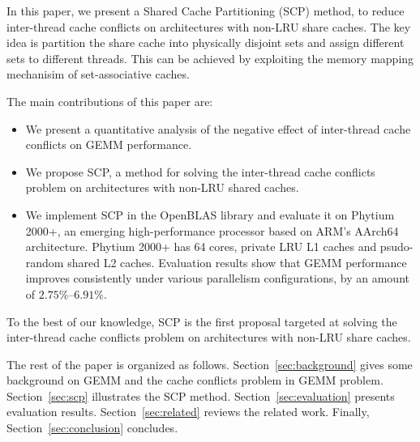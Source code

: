 In this paper, we present a Shared Cache Partitioning (SCP) method,
to reduce inter-thread cache conflicts on architectures with non-LRU share caches.
The key idea is partition the share cache into physically disjoint sets
and assign different sets to different threads. This can be achieved by
exploiting the memory mapping mechanisim of set-associative caches.

The main contributions of this paper are:
\begin{itemize}
\item We present a quantitative analysis of the negative effect of inter-thread cache
  conflicts on GEMM performance.
\item We propose SCP, a method for solving the inter-thread cache conflicts
  problem on architectures with non-LRU shared caches.
\item We implement SCP in the OpenBLAS library and evaluate it on Phytium 2000+,
  an emerging high-performance processor based on ARM's AArch64 architecture.
  Phytium 2000+ has 64 cores, private LRU L1 caches
  and psudo-random shared L2 caches.
  Evaluation results show that GEMM performance improves consistently
  under various parallelism configurations, by an amount of $2.75\%$--$6.91\%$.
\end{itemize}

To the best of our knowledge, SCP is the first proposal targeted at
solving the inter-thread cache conflicts problem on
architectures with non-LRU share caches.

The rest of the paper is organized as follows.
Section~\ref{sec:background} gives some background on GEMM and
the cache conflicts problem in GEMM problem.
Section~\ref{sec:scp} illustrates the SCP method.
Section~\ref{sec:evaluation} presents evaluation results.
Section~\ref{sec:related} reviews the related work.
Finally, Section~\ref{sec:conclusion} concludes.
